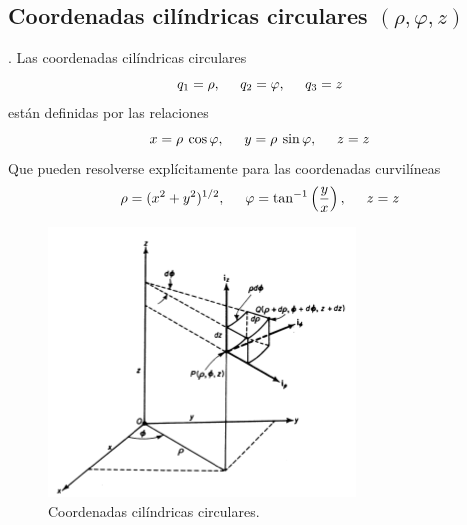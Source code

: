 \subsection{Coordenadas cilíndricas circulares $(\rho, \varphi, z)$}.
Las coordenadas cilíndricas circulares
\begin{equation}
    q_{1} = \rho, \hspace{0.5cm} q_{2} = \varphi, \hspace{0.5cm} q_{3} = z
    \label{eq:ecuacion_A_09_01}
\end{equation}
están definidas por las relaciones
\begin{equation}
    x = \rho \: \cos \varphi, \hspace{0.5cm} y = \rho \: \sin \varphi, \hspace{0.5cm} z = z
    \label{eq:ecuacion_A_09_02}
\end{equation}
Que pueden resolverse explícitamente para las coordenadas curvilíneas
\begin{equation}
    \rho = (x^{2} + y^{2})^{1/2}, \hspace{0.5cm} \varphi = \tan^{-1} \left( \dfrac{y}{x} \right), \hspace{0.5cm} z =z
    \label{eq:ecuacion_A_09_03}
\end{equation}
\begin{figure}
    \centering
    \includegraphics{./Imagenes/Sistema_01_Cilindrico_Circulares.png}
    \caption{Coordenadas cilíndricas circulares.}
\end{figure}
